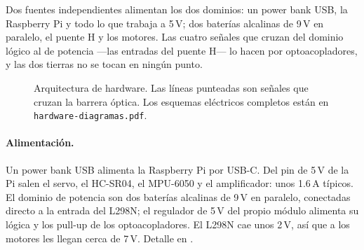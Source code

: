 \documentclass[11pt,a4paper]{article}
\newcommand{\id}[1]{\texttt{\detokenize{#1}}}
\begin{document}
Dos fuentes independientes alimentan los dos dominios: un power bank USB, la
Raspberry Pi y todo lo que trabaja a 5\,V; dos baterías alcalinas de 9\,V en
paralelo, el puente H y los motores. Las cuatro señales que cruzan del
dominio lógico al de potencia ---las entradas del puente H--- lo hacen por
optoacopladores, y las dos tierras no se tocan en ningún punto.

\begin{figure}[h]
\centering
{}
\caption{Arquitectura de hardware. Las líneas punteadas son señales que
cruzan la barrera óptica. Los esquemas eléctricos completos están en
\texttt{hardware-diagramas.pdf}.}
\end{figure}

\paragraph{Alimentación.} Un power bank USB alimenta la Raspberry Pi por
USB-C. Del pin de 5\,V de la Pi salen el servo, el HC-SR04, el MPU-6050 y el
amplificador: unos 1.6\,A típicos. El dominio de potencia son dos baterías
alcalinas de 9\,V en paralelo, conectadas directo a la entrada del L298N; el
regulador de 5\,V del propio módulo alimenta su lógica y los pull-up de los
optoacopladores. El L298N cae unos 2\,V, así que a los motores les llegan
cerca de 7\,V. Detalle en \id{docs/hardware-alimentacion.md}.
\end{document}
